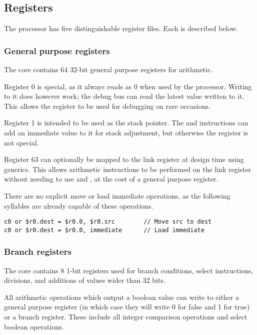 \subsection{Registers}
\label{sec:core-ug-isa-regs}

The \rvex{} processor has five distinguishable register files. Each is described
below.

\subsubsection{General purpose registers}
\label{sec:core-ug-isa-regs-gp}

The \rvex{} core contains 64 32-bit general purpose registers for arithmetic.

Register 0 is special, as it always reads as 0 when used by the processor.
Writing to it does however work; the debug bus can read the latest value written
to it. This allows the register to be used for debugging on rare occasions.

Register 1 is intended to be used as the stack pointer. The  and
 instructions can add an immediate value to it for stack adjustment,
but otherwise the register is not special.

Register 63 can optionally be mapped to the link register at design time using
generics. This allows arithmetic instructions to be performed on the link
register without needing to use  and , at the cost of a
general purpose register.

There are no explicit move or load immediate operations, as the following
syllables are already capable of these operations.

\begin{lstlisting}[numbers=none, basicstyle=\footnotesize, language=vexasm]
c0 or $r0.dest = $r0.0, $r0.src        // Move src to dest
c0 or $r0.dest = $r0.0, immediate      // Load immediate
\end{lstlisting}

\subsubsection{Branch registers}
\label{sec:core-ug-isa-regs-br}

The \rvex{} core contains 8 1-bit registers used for branch conditions, select
instructions, divisions, and additions of values wider than 32 bits.

All arithmetic operations which output a boolean value can write to either a
general purpose register (in which case they will write 0 for false and 1 for
true) or a branch register. These include all integer comparison operations and
select boolean operations.

